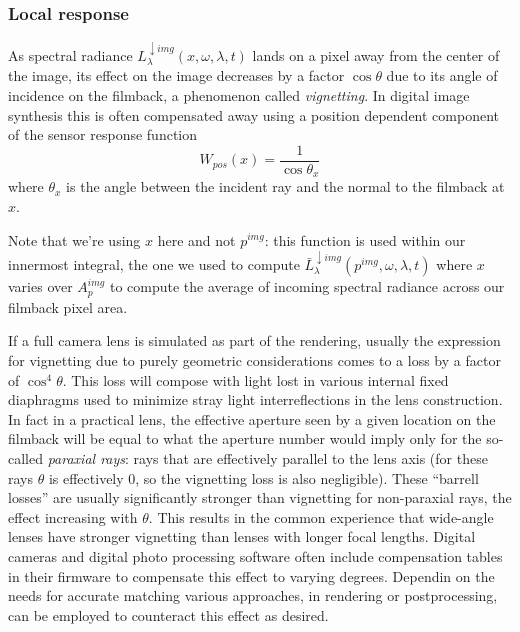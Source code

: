 \subsubsection{Local response}
As spectral radiance $L^{\downarrow img}_{\lambda}(x, \omega, \lambda, t)$ lands
on a pixel away from the center of the image, its effect on the image decreases 
by a factor $\cos\theta$ due to its angle of incidence on the \gls{filmback}, a 
phenomenon called \textsl{vignetting}. 
In digital image synthesis this is often compensated away using a position 
dependent component of the sensor response function
\begin{equation}
	W_{pos}(x) = \frac{1}{\cos\theta_{x}}
\end{equation}
where $\theta_{x}$ is the angle between the incident ray and the normal to the
\gls{filmback} at $x$. 


Note that we're using $x$ here and not $p^{img}$: this function is used within
our innermost integral, the one we used to compute  
$\bar L^{\downarrow img}_{\lambda}(p^{img}, \omega, \lambda, t)$
where $x$ varies over $A_p^{img}$ to compute the average of incoming
spectral \gls{radiance} across our filmback pixel area.

If a full camera lens is simulated as part of the rendering, usually the expression
for vignetting due to purely geometric considerations comes to a loss by a 
factor of $\cos^4\theta$. 
This loss will compose with light lost in various internal fixed 
diaphragms used to minimize stray light interreflections in the lens construction.
In fact in a practical lens, the effective aperture seen by a given 
location on the \gls{filmback} will be equal to what the aperture number would 
imply only for the so-called \textsl{paraxial rays}: rays that are effectively parallel to 
the lens axis (for these rays $\theta$ is effectively $0$, so the vignetting loss is also
negligible).
These ``barrell losses'' are usually significantly stronger than vignetting for non-paraxial
rays, the effect increasing with $\theta$.
This results in the common experience that wide-angle lenses have stronger vignetting
than lenses with longer focal lengths.
Digital cameras and digital photo processing software often include compensation 
tables in their firmware to compensate this effect to varying degrees.  
Dependin on the needs for accurate matching various approaches, in rendering or
postprocessing, can be employed to counteract this effect as desired.


